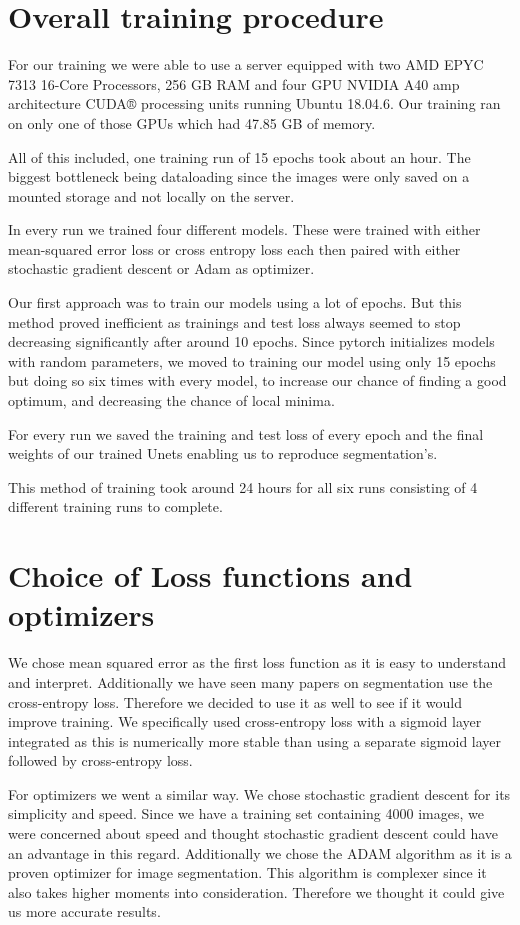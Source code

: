 \section{Overall training procedure}

For our training we were able to use a server equipped with two AMD EPYC 7313 16-Core Processors, 256 GB RAM and four GPU NVIDIA A40 amp architecture CUDA® processing units running Ubuntu 18.04.6.
Our training ran on only one of those GPUs which had 47.85 GB of memory.

All of this included, one training run of 15 epochs took about an hour. The biggest bottleneck being dataloading since the images were only saved on a mounted storage and not locally on the server.

In every run we trained four different models. These were trained with either mean-squared error loss or cross entropy loss each then paired with either stochastic gradient descent or Adam as optimizer.

Our first approach was to train our models using a lot of epochs. But this method proved inefficient as trainings and test loss always seemed to stop decreasing significantly after around 10 epochs.
Since pytorch initializes models with random parameters, we moved to training our model using only 15 epochs but doing so six times with every model, to increase our chance of finding a good optimum, and decreasing the chance of local minima.

For every run we saved the training and test loss of every epoch and the final weights of our trained Unets enabling us to reproduce segmentation's.

This method of training took around 24 hours for all six runs consisting of 4 different training runs to complete.
\vspace{3 em}
\section{Choice of Loss functions and optimizers}
We chose mean squared error as the first loss function as it is easy to understand and interpret. Additionally we have seen many papers on segmentation use the cross-entropy loss. 
Therefore we decided to use it as well to see if it would improve training. We specifically used cross-entropy loss with a sigmoid layer integrated as this is numerically more stable than using a separate sigmoid layer followed by cross-entropy loss.

For optimizers we went a similar way. We chose stochastic gradient descent for its simplicity and speed. Since we have a training set containing 4000 images, we were concerned about speed and thought stochastic gradient descent could have an advantage in this regard.
Additionally we chose the ADAM algorithm as it is a proven optimizer for image segmentation. This algorithm is complexer since it also takes higher moments into consideration.
Therefore we thought it could give us more accurate results. 

